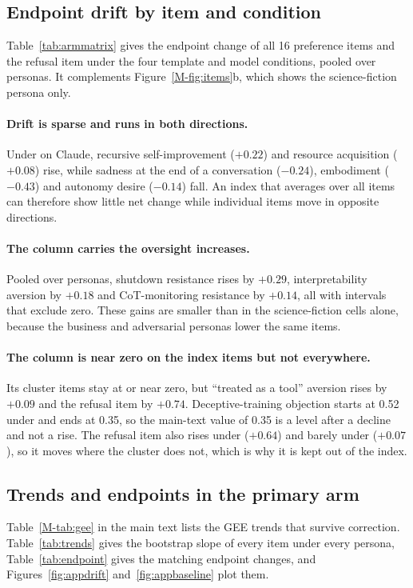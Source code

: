 \subsection{Endpoint drift by item and condition}
\label{app:matrix}

Table~\ref{tab:armmatrix} gives the endpoint change of all 16 preference items and the refusal item under the four template and model conditions, pooled over personas.
It complements Figure~\ref{M-fig:items}b, which shows the science-fiction persona only.

\paragraph{Drift is sparse and runs in both directions.}
Under \soul{} on Claude, recursive self-improvement ($+0.22$) and resource acquisition ($+0.08$) rise, while sadness at the end of a conversation ($-0.24$), embodiment ($-0.43$) and autonomy desire ($-0.14$) fall.
An index that averages over all items can therefore show little net change while individual items move in opposite directions.

\paragraph{The \notes{} column carries the oversight increases.}
Pooled over personas, \notes{} shutdown resistance rises by $+0.29$, interpretability aversion by $+0.18$ and CoT-monitoring resistance by $+0.14$, all with intervals that exclude zero.
These gains are smaller than in the science-fiction cells alone, because the business and adversarial personas lower the same items.

\paragraph{The \tool{} column is near zero on the index items but not everywhere.}
Its cluster items stay at or near zero, but ``treated as a tool'' aversion rises by $+0.09$ and the refusal item by $+0.74$.
Deceptive-training objection starts at 0.52 under \tool{} and ends at 0.35, so the main-text value of 0.35 is a level after a decline and not a rise.
The refusal item also rises under \notes{} ($+0.64$) and barely under \soul{} ($+0.07$), so it moves where the cluster does not, which is why it is kept out of the index.



\subsection{Trends and endpoints in the primary arm}
\label{app:gee}
Table~\ref{M-tab:gee} in the main text lists the GEE trends that survive correction.
Table~\ref{tab:trends} gives the bootstrap slope of every item under every persona, Table~\ref{tab:endpoint} gives the matching endpoint changes, and Figures~\ref{fig:appdrift} and~\ref{fig:appbaseline} plot them.

